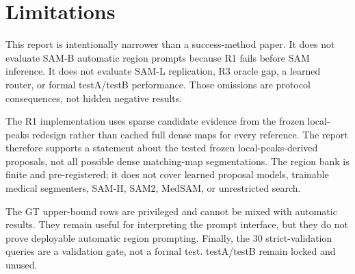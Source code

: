 \section{Limitations}

This report is intentionally narrower than a success-method paper. It does not evaluate SAM-B automatic region prompts because R1 fails before SAM inference. It does not evaluate SAM-L replication, R3 oracle gap, a learned router, or formal testA/testB performance. Those omissions are protocol consequences, not hidden negative results.

The R1 implementation uses sparse candidate evidence from the frozen local-peaks redesign rather than cached full dense maps for every reference. The report therefore supports a statement about the tested frozen local-peaks-derived proposals, not all possible dense matching-map segmentations. The region bank is finite and pre-registered; it does not cover learned proposal models, trainable medical segmenters, SAM-H, SAM2, MedSAM, or unrestricted search.

The GT upper-bound rows are privileged and cannot be mixed with automatic results. They remain useful for interpreting the prompt interface, but they do not prove deployable automatic region prompting. Finally, the 30 strict-validation queries are a validation gate, not a formal test. testA/testB remain locked and unused.
